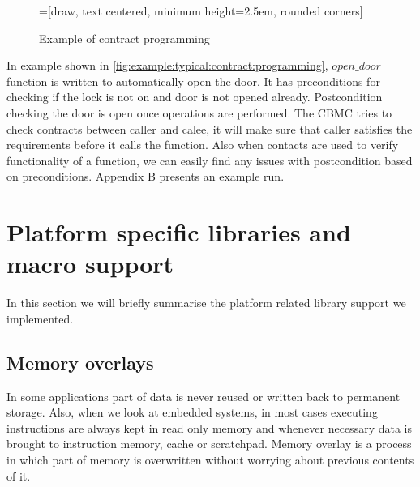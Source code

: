 \begin{figure}[htbp]
    \centering
    =[draw, text centered, minimum height=2.5em, rounded corners]
   \caption{Example of contract programming}
   \label{fig:example:typical:contract:programming}
\end{figure}


In example shown in \autoref{fig:example:typical:contract:programming}, $open\_door$ function is written to automatically open the door. It has preconditions for checking if the lock is not on and door is not opened already. Postcondition checking the door is open once operations are performed. The CBMC tries to check contracts between caller and calee, it will make sure that caller satisfies the requirements before it calls the function. Also when contacts are used to verify functionality of a function, we can easily find any issues with postcondition based on preconditions. Appendix B presents an example run.

\section{Platform specific libraries and macro support}

In this section we will briefly summarise the platform related library support we implemented.

\subsection{Memory overlays}
In some applications part of data is never reused or written back to permanent storage. Also, when we look at embedded systems, in most cases executing instructions are always kept in read only memory and whenever necessary data is brought to instruction memory, cache or scratchpad. Memory overlay is a process in which part of memory is overwritten without worrying about previous contents of it.

